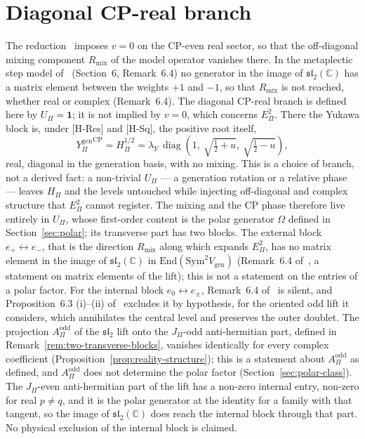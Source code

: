 \documentclass[11pt]{article}
\theoremstyle{definition}
\theoremstyle{remark}
\newcommand{\JPi}{J_{\Pi}}
\newcommand{\Epi}{E_{\Pi}}
\newcommand{\Ygen}{{Y^{\mathrm{gen}}_{\Pi}}}
\newcommand{\Hpi}{H_{\Pi}}
\newcommand{\Upi}{U_{\Pi}}
\newcommand{\Opol}{\Omega}
\newcommand{\Aodd}{A_{\Pi}^{\mathrm{odd}}}
\newcommand{\lamY}{\lambda_{Y}}
\newcommand{\Sym}{\mathrm{Sym}}
\newcommand{\diag}{\operatorname{diag}}
\begin{document}
  \section{Diagonal CP-real branch}
    \label{sec:cp-real}

    The reduction~\cite{Beau2026prs} imposes $v = 0$ on the CP-even real sector, so that the off-diagonal mixing
    component $R_{\mathrm{mix}}$ of the model operator vanishes there.
    In the metaplectic step model of~\cite{Beau2026q14} (Section~6, Remark~6.4) no generator in the image of
    $\mathfrak{sl}_{2}(\mathbb{C})$ has a matrix element between the weights $+1$ and $-1$,
    so that $R_{\mathrm{mix}}$ is not reached, whether real or complex (Remark~6.4).
    The diagonal CP-real branch is defined here by $\Upi = \mathbf{1}$; it is not implied by $v = 0$, which concerns
    $\Epi^{2}$.
    There the Yukawa block is, under [H-Res] and [H-Sq], the positive root itself,
    \begin{equation}
      \label{eq:cp-real}
      \Ygen^{\mathrm{CP}} = \Hpi^{1/2} = \lamY\,\diag\!\left(1,\ \sqrt{\tfrac12 + u},\ \sqrt{\tfrac12 - u}\right),
    \end{equation}
    real, diagonal in the generation basis, with no mixing.
    This is a choice of branch, not a derived fact: a non-trivial $\Upi$ --- a generation rotation or a
    relative phase --- leaves $\Hpi$ and the levels untouched while injecting off-diagonal and complex
    structure that $\Epi^{2}$ cannot register.
    The mixing and the CP phase therefore live entirely in $\Upi$, whose first-order content is the polar generator
    $\Opol$ defined in Section~\ref{sec:polar}; its transverse part has two blocks.
    The external block $e_{+} \leftrightarrow e_{-}$, that is the direction $R_{\mathrm{mix}}$ along which
    \cite{Beau2026prs} expands $\Epi^{2}$, has no matrix element in the image of $\mathfrak{sl}_{2}(\mathbb{C})$ in
    $\mathrm{End}(\Sym^{2} V_{\mathrm{gen}})$ (Remark~6.4 of~\cite{Beau2026q14}, a statement on matrix elements of the
    lift); this is not a statement on the entries of a polar factor.
    For the internal block $e_{0} \leftrightarrow e_{\pm}$, Remark~6.4 of~\cite{Beau2026q14} is silent, and
    Proposition~6.3 (i)--(ii) of~\cite{Beau2026q14} excludes it by hypothesis, for the oriented odd lift it considers,
    which annihilates the central level and preserves the outer doublet.
    The projection $\Aodd$ of the $\mathfrak{sl}_{2}$ lift onto the $\JPi$-odd anti-hermitian part, defined in
    Remark~\ref{rem:two-transverse-blocks}, vanishes identically for every complex coefficient
    (Proposition~\ref{prop:reality-structure}); this is a statement about $\Aodd$ as defined, and $\Aodd$ does
    not determine the polar factor (Section~\ref{sec:polar-class}).
    The $\JPi$-even anti-hermitian part of the lift has a non-zero internal entry, non-zero for real $p \neq q$, and
    it is the polar generator at the identity for a family with that tangent, so the image of
    $\mathfrak{sl}_{2}(\mathbb{C})$ does reach the internal block through that part.
    No physical exclusion of the internal block is claimed.
\end{document}
